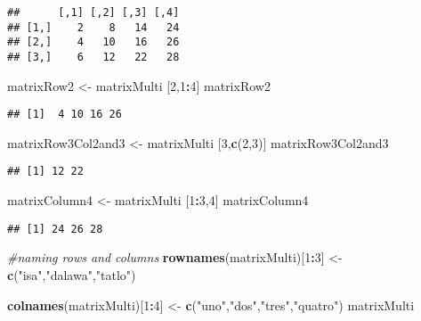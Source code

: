 \documentclass[
]{article}
\newenvironment{Shaded}{\begin{snugshade}}{\end{snugshade}}
\newcommand{\CommentTok}[1]{\textcolor[rgb]{0.56,0.35,0.01}{\textit{#1}}}
\newcommand{\DecValTok}[1]{\textcolor[rgb]{0.00,0.00,0.81}{#1}}
\newcommand{\FunctionTok}[1]{\textcolor[rgb]{0.13,0.29,0.53}{\textbf{#1}}}
\newcommand{\NormalTok}[1]{#1}
\newcommand{\OtherTok}[1]{\textcolor[rgb]{0.56,0.35,0.01}{#1}}
\newcommand{\SpecialCharTok}[1]{\textcolor[rgb]{0.81,0.36,0.00}{\textbf{#1}}}
\newcommand{\StringTok}[1]{\textcolor[rgb]{0.31,0.60,0.02}{#1}}
\begin{document}
\begin{verbatim}
##      [,1] [,2] [,3] [,4]
## [1,]    2    8   14   24
## [2,]    4   10   16   26
## [3,]    6   12   22   28
\end{verbatim}

\begin{Shaded}
\begin{Highlighting}[]
\NormalTok{matrixRow2 }\OtherTok{\textless{}{-}}\NormalTok{ matrixMulti [}\DecValTok{2}\NormalTok{,}\DecValTok{1}\SpecialCharTok{:}\DecValTok{4}\NormalTok{]}
\NormalTok{matrixRow2 }
\end{Highlighting}
\end{Shaded}

\begin{verbatim}
## [1]  4 10 16 26
\end{verbatim}

\begin{Shaded}
\begin{Highlighting}[]
\NormalTok{matrixRow3Col2and3 }\OtherTok{\textless{}{-}}\NormalTok{ matrixMulti [}\DecValTok{3}\NormalTok{,}\FunctionTok{c}\NormalTok{(}\DecValTok{2}\NormalTok{,}\DecValTok{3}\NormalTok{)]}
\NormalTok{matrixRow3Col2and3}
\end{Highlighting}
\end{Shaded}

\begin{verbatim}
## [1] 12 22
\end{verbatim}

\begin{Shaded}
\begin{Highlighting}[]
\NormalTok{matrixColumn4 }\OtherTok{\textless{}{-}}\NormalTok{ matrixMulti [}\DecValTok{1}\SpecialCharTok{:}\DecValTok{3}\NormalTok{,}\DecValTok{4}\NormalTok{]}
\NormalTok{matrixColumn4}
\end{Highlighting}
\end{Shaded}

\begin{verbatim}
## [1] 24 26 28
\end{verbatim}

\begin{Shaded}
\begin{Highlighting}[]
\CommentTok{\#naming rows and columns}
\FunctionTok{rownames}\NormalTok{(matrixMulti)[}\DecValTok{1}\SpecialCharTok{:}\DecValTok{3}\NormalTok{] }\OtherTok{\textless{}{-}} \FunctionTok{c}\NormalTok{(}\StringTok{"isa"}\NormalTok{,}\StringTok{"dalawa"}\NormalTok{,}\StringTok{"tatlo"}\NormalTok{)}

\FunctionTok{colnames}\NormalTok{(matrixMulti)[}\DecValTok{1}\SpecialCharTok{:}\DecValTok{4}\NormalTok{] }\OtherTok{\textless{}{-}} \FunctionTok{c}\NormalTok{(}\StringTok{"uno"}\NormalTok{,}\StringTok{"dos"}\NormalTok{,}\StringTok{"tres"}\NormalTok{,}\StringTok{"quatro"}\NormalTok{)}
\NormalTok{matrixMulti}
\end{Highlighting}
\end{Shaded}
\end{document}
